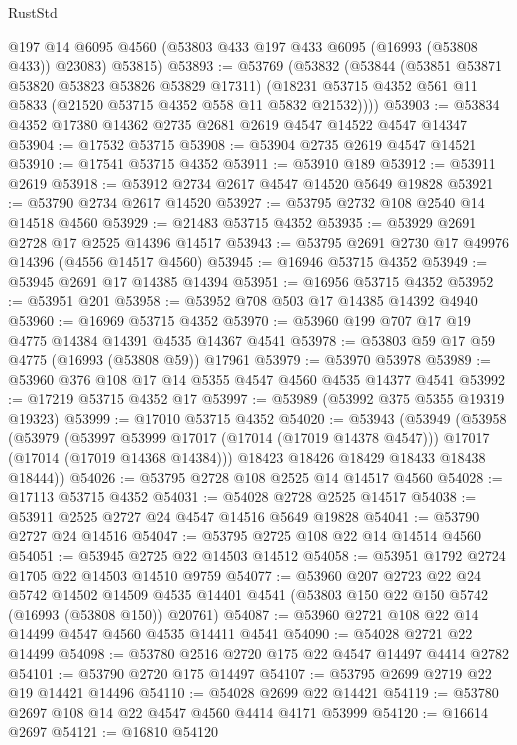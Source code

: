 \begin{lexlean}{RustStd}
\begin{coremodule}
      @197
      @14
      @6095
      @4560
      (@53803 @433 @197 @433 @6095 (@16993 (@53808 @433)) @23083)
      @53815)
@53893 := @53769
    (@53832
      (@53844
        (@53851 @53871 @53820 @53823 @53826 @53829 @17311)
        (@18231 @53715 @4352 @561 @11 @5833 (@21520 @53715 @4352 @558 @11 @5832 @21532))))
@53903 := @53834 @4352 @17380 @14362 @2735 @2681 @2619 @4547 @14522 @4547 @14347
@53904 := @17532 @53715
@53908 := @53904 @2735 @2619 @4547 @14521
@53910 := @17541 @53715 @4352
@53911 := @53910 @189
@53912 := @53911 @2619
@53918 := @53912 @2734 @2617 @4547 @14520 @5649 @19828
@53921 := @53790 @2734 @2617 @14520
@53927 := @53795 @2732 @108 @2540 @14 @14518 @4560
@53929 := @21483 @53715 @4352
@53935 := @53929 @2691 @2728 @17 @2525 @14396 @14517
@53943 := @53795 @2691 @2730 @17 @49976 @14396 (@4556 @14517 @4560)
@53945 := @16946 @53715 @4352
@53949 := @53945 @2691 @17 @14385 @14394
@53951 := @16956 @53715 @4352
@53952 := @53951 @201
@53958 := @53952 @708 @503 @17 @14385 @14392 @4940
@53960 := @16969 @53715 @4352
@53970 := @53960 @199 @707 @17 @19 @4775 @14384 @14391 @4535 @14367 @4541
@53978 := @53803 @59 @17 @59 @4775 (@16993 (@53808 @59)) @17961
@53979 := @53970 @53978
@53989 := @53960 @376 @108 @17 @14 @5355 @4547 @4560 @4535 @14377 @4541
@53992 := @17219 @53715 @4352 @17
@53997 := @53989 (@53992 @375 @5355 @19319 @19323)
@53999 := @17010 @53715 @4352
@54020 := @53943
    (@53949
      (@53958
        (@53979
          (@53997 @53999 @17017 (@17014 (@17019 @14378 @4547)))
          @17017
          (@17014 (@17019 @14368 @14384)))
        @18423
        @18426
        @18429
        @18433
        @18438
        @18444))
@54026 := @53795 @2728 @108 @2525 @14 @14517 @4560
@54028 := @17113 @53715 @4352
@54031 := @54028 @2728 @2525 @14517
@54038 := @53911 @2525 @2727 @24 @4547 @14516 @5649 @19828
@54041 := @53790 @2727 @24 @14516
@54047 := @53795 @2725 @108 @22 @14 @14514 @4560
@54051 := @53945 @2725 @22 @14503 @14512
@54058 := @53951 @1792 @2724 @1705 @22 @14503 @14510 @9759
@54077 := @53960
    @207
    @2723
    @22
    @24
    @5742
    @14502
    @14509
    @4535
    @14401
    @4541
    (@53803 @150 @22 @150 @5742 (@16993 (@53808 @150)) @20761)
@54087 := @53960 @2721 @108 @22 @14 @14499 @4547 @4560 @4535 @14411 @4541
@54090 := @54028 @2721 @22 @14499
@54098 := @53780 @2516 @2720 @175 @22 @4547 @14497 @4414 @2782
@54101 := @53790 @2720 @175 @14497
@54107 := @53795 @2699 @2719 @22 @19 @14421 @14496
@54110 := @54028 @2699 @22 @14421
@54119 := @53780 @2697 @108 @14 @22 @4547 @4560 @4414 @4171 @53999
@54120 := @16614 @2697
@54121 := @16810 @54120

\end{coremodule}
\end{lexlean}
